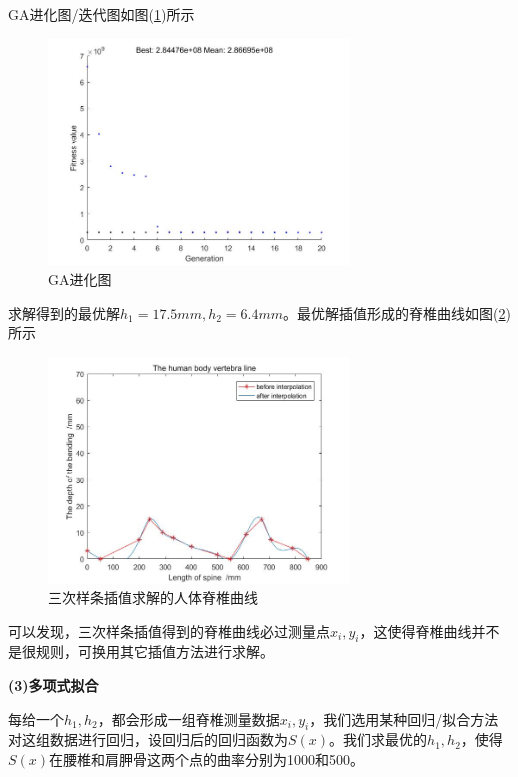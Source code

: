             \par
            GA进化图/迭代图如图(\ref{fig:GA进化图})所示
            \begin{figure}[H]
            \centering
            \includegraphics[width = 8cm]{images/GA_jizuiquxian.jpg}
            \caption{GA进化图}
            \label{fig:GA进化图}
            \end{figure}
            \par
            求解得到的最优解$h_1 =17.5mm,h_2=6.4mm$。最优解插值形成的脊椎曲线如图(\ref{三次样条插值求解的人体脊椎曲线})所示
            \begin{figure}[H]
            \centering
            \includegraphics[width = 8cm]{images/jizuiquxian_sanciyangtiao.jpg}
            \caption{三次样条插值求解的人体脊椎曲线}
            \label{三次样条插值求解的人体脊椎曲线}
            \end{figure}
            可以发现，三次样条插值得到的脊椎曲线必过测量点$x_i,y_i$，这使得脊椎曲线并不是很规则，可换用其它插值方法进行求解。
            \par
            \textbf{(3)多项式拟合}
            \par
            每给一个$h_1,h_2$，都会形成一组脊椎测量数据$x_i,y_i$，我们选用某种回归/拟合方法对这组数据进行回归，设回归后的回归函数为$S(x)$。我们求最优的$h_1,h_2$，使得$S(x)$在腰椎和肩胛骨这两个点的曲率分别为1000和500。
